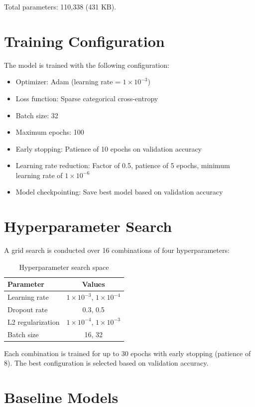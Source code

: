 \documentclass[12pt,a4paper,oneside]{report}
\begin{document}
Total parameters: 110,338 (431 KB).

\section{Training Configuration}

The model is trained with the following configuration:
\begin{itemize}
    \item Optimizer: Adam (learning rate = \(1 \times 10^{-3}\))
    \item Loss function: Sparse categorical cross-entropy
    \item Batch size: 32
    \item Maximum epochs: 100
    \item Early stopping: Patience of 10 epochs on validation accuracy
    \item Learning rate reduction: Factor of 0.5, patience of 5 epochs, minimum learning rate of \(1 \times 10^{-6}\)
    \item Model checkpointing: Save best model based on validation accuracy
\end{itemize}

\section{Hyperparameter Search}

A grid search is conducted over 16 combinations of four hyperparameters:

\begin{table}[H]
\centering
\begin{tabular}{lc}
\toprule
Parameter & Values \\
\midrule
Learning rate & \(1 \times 10^{-3}\), \(1 \times 10^{-4}\) \\
Dropout rate & 0.3, 0.5 \\
L2 regularization & \(1 \times 10^{-4}\), \(1 \times 10^{-3}\) \\
Batch size & 16, 32 \\
\bottomrule
\end{tabular}
\caption{Hyperparameter search space}
\label{tab:hparam}
\end{table}

Each combination is trained for up to 30 epochs with early stopping (patience of 8). The best configuration is selected based on validation accuracy.

\section{Baseline Models}
\end{document}
